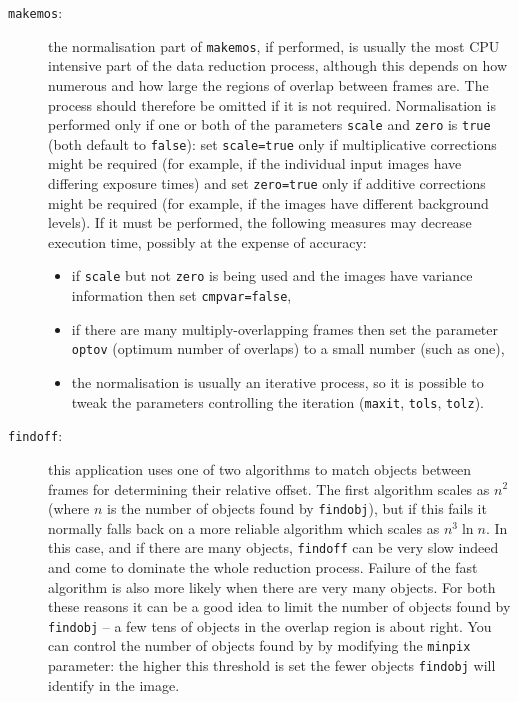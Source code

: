 \documentclass[twoside,11pt]{starlink}
\begin{document}
\begin{description}
  \item[\texttt{makemos}:] the normalisation part of \texttt{makemos}, if performed,
   is usually the most CPU intensive part of the data reduction process,
   although this depends on how numerous and how large the regions of overlap
   between frames are.
   The process should therefore be omitted if it is not required.
   Normalisation is performed only if one or both of the parameters \texttt{scale} and \texttt{zero} is \texttt{true} (both default to \texttt{false}):
   set \texttt{scale=true} only if multiplicative corrections might be required
   (for example, if the individual input images have differing exposure times)
   and set \texttt{zero=true} only if additive corrections might be required
   (for example, if the images have different background levels).
   If it must be performed, the following measures may decrease execution
   time, possibly at the expense of accuracy:

  \begin{itemize}

    \item if \texttt{scale} but not \texttt{zero} is being used and the images
     have variance information then set \texttt{cmpvar=false},

    \item if there are many multiply-overlapping frames then set the
     parameter \texttt{optov} (optimum number of overlaps) to a small number
     (such as one),

    \item the normalisation is usually an iterative process, so it is
     possible to tweak the parameters controlling the iteration (\texttt{maxit}, \texttt{tols}, \texttt{tolz}).

  \end{itemize}

  \item[\texttt{findoff}:] this application uses one of two algorithms to match
   objects between frames for determining their relative offset.
   The first algorithm scales as $n^2$ (where $n$ is the number of objects
   found by \texttt{findobj}), but if this fails it normally falls back on a
   more reliable algorithm which scales as $n^3 \ln n$.
   In this case, and if there are many objects, \texttt{findoff} can be very
   slow indeed and come to dominate the whole reduction process.
   Failure of the fast algorithm is also more likely when there are
   very many objects.
   For both these reasons it can be a good idea to limit the number of
   objects found by \texttt{findobj} -- a few tens of objects in the overlap
   region is about right.
   You can control the number of objects found by by modifying the \texttt{minpix} parameter: the higher this threshold is set the fewer
   objects \texttt{findobj} will identify in the image.

\end{description}
\end{document}
